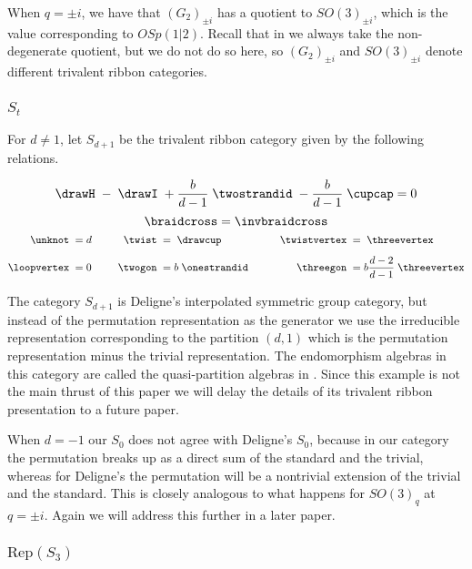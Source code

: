 \documentclass[12pt]{amsart}
\begin{document}
When $q = \pm i$, we have that $(G_2)_{\pm i}$ has a quotient to $SO(3)_{\pm i}$, which is the value corresponding to $OSp(1|2)$.  Recall that in \cite{MR3624901} we always take the non-degenerate quotient, but we do not do so here, so $(G_2)_{\pm i}$ and $SO(3)_{\pm i}$ denote different trivalent ribbon categories. 

\subsubsection{$S_t$}

\begin{definition}
For $d \neq 1$, let  $S_{d+1}$ be the trivalent ribbon category given by the following relations.

$$  \drawH \; - \; \drawI \; + \frac{b}{d-1}\; \twostrandid \; -  \frac{b}{d-1}\; \cupcap = 0$$
$$\braidcross  =  \invbraidcross$$
\begin{align*}
    \unknot\; &= d &\qquad
      \twist\; &=  \;\drawcup&\qquad
        \twistvertex\; &=  \;\threevertex\\[5pt]
    \loopvertex\;&=0&
      \twogon\;&= b\;\onestrandid&
        \threegon\; &= b \frac{d-2}{d-1}\;\threevertex
\end{align*}
\end{definition}

The category $S_{d+1}$ is Deligne's interpolated symmetric group category, but instead of the permutation representation as the generator we use the irreducible representation corresponding to the partition $(d,1)$ which is the permutation representation minus the trivial representation.  The endomorphism algebras in this category are called the quasi-partition algebras in \cite{MR3177889}.  Since this example is not the main thrust of this paper we will delay the details of its trivalent ribbon presentation to a future paper.

\begin{warning}
When $d=-1$ our $S_0$ does not agree with Deligne's $S_0$, because in our category the permutation breaks up as a direct sum of the standard and the trivial, whereas for Deligne's the permutation will be a nontrivial extension of the trivial and the standard.  This is closely analogous to what happens for $SO(3)_q$ at $q=\pm i$.  Again we will address this further in a later paper.
\end{warning}



\subsubsection{$\text{Rep}(S_3)$}
\end{document}
